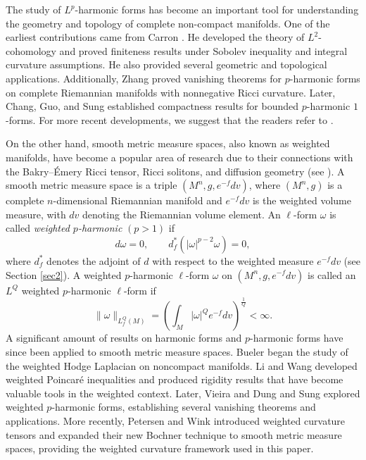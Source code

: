 \documentclass[leqno,12pt]{article} %
\theoremstyle{plain} %
\theoremstyle{definition} %
\numberwithin{equation}{section}
\begin{document}
The study of $L^p$-harmonic forms has become an important tool for understanding the geometry and topology of complete non-compact manifolds. One of the earliest contributions came from Carron \cite{Car98,Car99}. He developed the theory of $L^2$-cohomology and proved finiteness results under Sobolev inequality and integral curvature assumptions. He also provided several geometric and topological applications. Additionally, Zhang \cite{ZG01} proved vanishing theorems for $p$-harmonic forms on complete Riemannian manifolds with nonnegative Ricci curvature. Later, Chang, Guo, and Sung \cite{CGS10} established compactness results for bounded $p$-harmonic $1$-forms. For more recent developments, we suggest that the readers refer to \cite{CY16,CHB21,DDT23}.



On the other hand, smooth metric measure spaces, also known as weighted manifolds, have become a popular area of research due to their connections with the Bakry–Émery Ricci tensor, Ricci solitons, and diffusion geometry (see \cite{LO03,WW09}).  A smooth metric measure space is a triple $(M^n,g,e^{-f}dv)$, where $(M^n,g)$ is a complete $n$-dimensional Riemannian manifold and $e^{-f}dv$ is the weighted volume measure, with $dv$ denoting the Riemannian volume element.
An $\ell$-form $\omega$ is called \emph{weighted $p$-harmonic} $(p>1)$ if
\[
d\omega=0,\qquad d_f^*(|\omega|^{p-2}\omega)=0,
\]
where $d_f^*$ denotes the adjoint of $d$ with respect to the weighted measure $e^{-f}dv$ (see Section \ref{sec2}). A weighted $p$-harmonic $\ell$-form $\omega$ on $(M^n,g,e^{-f}dv)$ is called an $L^Q$ weighted $p$-harmonic $\ell$-form  if
\[
\|\omega\|_{L_f^Q(M)}
=
\left(
\int_M |\omega|^Qe^{-f}dv
\right)^{\frac1Q}
<\infty.
\]
A significant amount of results on harmonic forms and $p$-harmonic forms have since been applied to smooth metric measure spaces. Bueler \cite{B99} began the study of the weighted Hodge Laplacian on noncompact manifolds. Li and Wang \cite{LW06} developed weighted Poincaré inequalities and produced rigidity results that have become valuable tools in the weighted context. Later, Vieira \cite{VI13} and Dung and Sung \cite{DS19} explored weighted $p$-harmonic forms, establishing several vanishing theorems and applications. More recently, Petersen and Wink \cite{PW20} introduced weighted curvature tensors and expanded their new Bochner technique to smooth metric measure spaces, providing the weighted curvature framework used in this paper.
\end{document}
